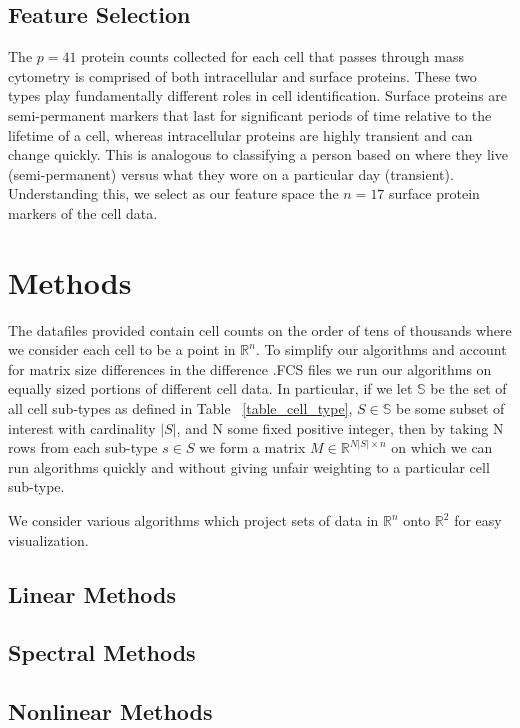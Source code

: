 \documentclass{article}
\begin{document}
\subsection{Feature Selection}
The $p=41$ protein counts collected for each cell that passes through mass cytometry is comprised of both intracellular and surface proteins. These two types play fundamentally different roles in cell identification. Surface proteins are semi-permanent markers that last for significant periods of time relative to the lifetime of a cell, whereas intracellular proteins are highly transient and can change quickly. This is analogous to classifying a person based on where they live (semi-permanent) versus what they wore on a particular day (transient). Understanding this, we select as our feature space the $n=17$ surface protein markers of the cell data.

\section{Methods}
\label{methods}

The datafiles provided contain cell counts on the order of tens of thousands where we consider each cell to be a point in $\mathbb{R}^n$. To simplify our algorithms and account for matrix size differences in the difference .FCS files we run our algorithms on equally sized portions of different cell data. In particular, if we let $\mathbb{S}$ be the set of all cell sub-types as defined in Table ~\ref{table_cell_type}, $S \in \mathbb{S}$  be some subset of interest with cardinality $|S|$, and N some fixed positive integer, then by taking N rows from each sub-type $s \in S$ we form a matrix $M \in \mathbb{R}^{N |S| \times n}$ on which we can run algorithms quickly and without giving unfair weighting to a particular cell sub-type.

We consider various algorithms which project sets of data in $\mathbb{R}^n$ onto $\mathbb{R}^2$ for easy visualization.

\subsection{Linear Methods}

\subsection{Spectral Methods}

\subsection{ Nonlinear Methods}
\end{document}
